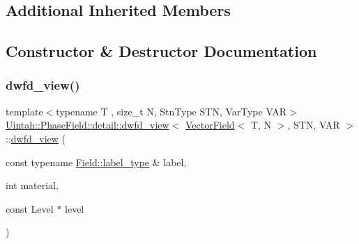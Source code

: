 \subsection*{Additional Inherited Members}


\subsection{Constructor \& Destructor Documentation}
\mbox{\label{classUintah_1_1PhaseField_1_1detail_1_1dwfd__view_3_01VectorField_3_01T_00_01N_01_4_00_01STN_00_01VAR_01_4_a33c0620dcc95371fc3e259301b0f8c96}} 
\subsubsection{\texorpdfstring{dwfd\+\_\+view()}{dwfd\_view()}\hspace{0.1cm}{\footnotesize\ttfamily [1/3]}}
{\footnotesize\ttfamily template$<$typename T , size\+\_\+t N, Stn\+Type S\+TN, Var\+Type V\+AR$>$ \\
\hyperlink{classUintah_1_1PhaseField_1_1detail_1_1dwfd__view}{Uintah\+::\+Phase\+Field\+::detail\+::dwfd\+\_\+view}$<$ \hyperlink{structUintah_1_1PhaseField_1_1VectorField}{Vector\+Field}$<$ T, N $>$, S\+TN, V\+AR $>$\+::\hyperlink{classUintah_1_1PhaseField_1_1detail_1_1dwfd__view}{dwfd\+\_\+view} (\begin{DoxyParamCaption}\item[{const typename \hyperlink{structUintah_1_1PhaseField_1_1VectorField_a59698346336d8cdfdf767367839f2be9}{Field\+::label\+\_\+type} \&}]{label,  }\item[{int}]{material,  }\item[{const Level $\ast$}]{level }\end{DoxyParamCaption})\hspace{0.3cm}{\ttfamily [inline]}}



